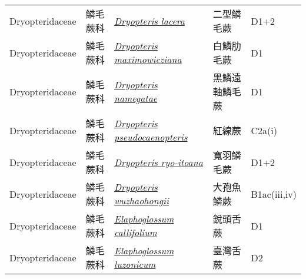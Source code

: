 {\begin{longtable}{L{2.5cm}L{2cm}L{5cm}L{2.5cm}L{3cm}}
    Dryopteridaceae & 鱗毛蕨科 & \href{http://www.theplantlist.org/tpl1.1/search?q=Dryopteris+lacera}{\textit{Dryopteris lacera} } & 二型鱗毛蕨 & D1+2    \\
    Dryopteridaceae & 鱗毛蕨科 & \href{http://www.theplantlist.org/tpl1.1/search?q=Dryopteris+maximowicziana}{\textit{Dryopteris maximowicziana} } & 白鱗肋毛蕨 & D1    \\
    Dryopteridaceae & 鱗毛蕨科 & \href{http://www.theplantlist.org/tpl1.1/search?q=Dryopteris+namegatae}{\textit{Dryopteris namegatae} } & 黑鱗遠軸鱗毛蕨 & D1    \\
    Dryopteridaceae & 鱗毛蕨科 & \href{http://www.theplantlist.org/tpl1.1/search?q=Dryopteris+pseudocaenopteris}{\textit{Dryopteris pseudocaenopteris} } & 紅線蕨 & C2a(i)    \\
    Dryopteridaceae & 鱗毛蕨科 & \href{http://www.theplantlist.org/tpl1.1/search?q=Dryopteris+ryo-itoana}{\textit{Dryopteris ryo-itoana} } & 寬羽鱗毛蕨 & D1+2    \\
    Dryopteridaceae & 鱗毛蕨科 & \href{http://www.theplantlist.org/tpl1.1/search?q=Dryopteris+wuzhaohongii}{\textit{Dryopteris wuzhaohongii} } & 大孢魚鱗蕨 & B1ac(iii,iv)    \\
    Dryopteridaceae & 鱗毛蕨科 & \href{http://www.theplantlist.org/tpl1.1/search?q=Elaphoglossum+callifolium}{\textit{Elaphoglossum callifolium} } & 銳頭舌蕨 & D1    \\
    Dryopteridaceae & 鱗毛蕨科 & \href{http://www.theplantlist.org/tpl1.1/search?q=Elaphoglossum+luzonicum}{\textit{Elaphoglossum luzonicum} } & 臺灣舌蕨 & D2    \\

\end{longtable}}
